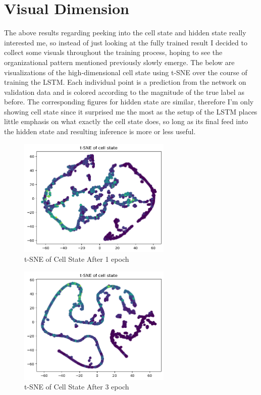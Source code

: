 \documentclass[12pt, twoside]{report}
\begin{document}
\section{Visual Dimension}

The above results regarding peeking into the cell state and hidden state really interested me,
so instead of just looking at the fully trained result I decided to collect some visuals throughout
the training process, hoping to see the organizational pattern mentioned previously slowly emerge.
The below are visualizations of the high-dimensional cell state using t-SNE over the course of training the LSTM.
Each individual point is a prediction from the network on validation data and is colored according to the 
magnitude of the true label as before.
The corresponding figures for hidden state are similar, therefore I'm only showing cell state since it surprised me
the most as the setup of the LSTM places little emphasis on what exactly the cell state does, so long as its final
feed into the hidden state and resulting inference is more or less useful.

\begin{figure}[H]
    \centering
    \includegraphics[width=0.65\textwidth]{figures/cell state evolution/1 epoch.png}
    \caption*{t-SNE of Cell State After 1 epoch}
\end{figure}

\begin{figure}[H]
    \centering
    \includegraphics[width=0.65\textwidth]{figures/cell state evolution/3 epoch.png}
    \caption*{t-SNE of Cell State After 3 epoch}
\end{figure}
\end{document}
